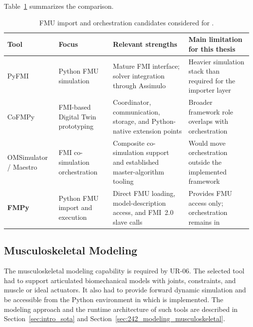 Table~\ref{tab:fmu_import_tool_comparison} summarizes the comparison.

\begin{table}[htbp]
  \centering
  \small
  \caption[\ac{FMU} import and orchestration candidates]{\ac{FMU} import and orchestration candidates considered for \syssimx{}.}
  \label{tab:fmu_import_tool_comparison}
  \begin{tabular}{p{2.5cm} p{3.0cm} p{4.5cm} p{4.0cm}}
    \toprule
    \textbf{Tool}        & \textbf{Focus}                     & \textbf{Relevant strengths}                                             & \textbf{Main limitation for this thesis} \\
    \midrule
    PyFMI                & Python \ac{FMU} simulation              & Mature \ac{FMI} interface; solver integration through Assimulo                & Heavier simulation stack than required for the importer layer \\
    \addlinespace
    CoFMPy               & \ac{FMI}-based Digital Twin prototyping & Coordinator, communication, storage, and Python-native extension points  & Broader framework role overlaps with \syssimx{} orchestration \\
    \addlinespace
    OMSimulator / Maestro  & \ac{FMI} co-simulation orchestration    & Composite co-simulation support and established master-algorithm tooling & Would move orchestration outside the implemented framework \\
    \addlinespace
    \textbf{FMPy} & Python \ac{FMU} import and execution     & Direct \ac{FMU} loading, model-description access, and \ac{FMI}~2.0 slave calls    & Provides \ac{FMU} access only; orchestration remains in \syssimx{} \\
    \bottomrule
  \end{tabular}
\end{table}

\subsection{Musculoskeletal Modeling}
\label{sec:tool_musculoskeletal}

The musculoskeletal modeling capability is required by UR-06.
The selected tool had to support articulated biomechanical models with joints, constraints, and muscle or ideal actuators.
It also had to provide forward dynamic simulation and be accessible from the Python environment in which \syssimx{} is implemented.
The modeling approach and the runtime architecture of such tools are described in Section~\ref{sec:intro_sota} and Section~\ref{sec:242_modeling_musculoskeletal}.

